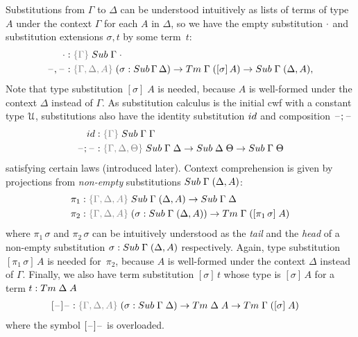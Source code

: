 \documentclass[a4paper,UKenglish,numberwithinsect,cleveref,thm-restate]{lipics-v2021}
\begin{document}
Substitutions from $\Gamma$ to $\Delta$ can be understood intuitively as lists of terms of type $A$ under the context $\Gamma$ for each $A$ in $\Delta$, so we have the empty substitution $\cdot$ and substitution extensions $\sigma, t$ by some term~$t$:
\begin{alignat*}{3}
  \emptysub & : \implicit{\Gamma}\;\Sub\;\Gamma\;\emptyctx \\
  \blank,\blank & : \implicit{\Gamma, \Delta, A}\;(\sigma : \Sub\,\Gamma\,\Delta) \to \Tm\;\Gamma\;([ \sigma ]\, A) \to \Sub\;\Gamma\;(\Delta, A),
\end{alignat*}
Note that type substitution $[\sigma]\;A$ is needed, because $A$ is well-formed under the context $\Delta$ instead of $\Gamma$.
As substitution calculus is the initial cwf with a constant type $\mathcal{U}$, substitutions also have the identity substitution $\idS$ and composition $\mathord{\hspace{1pt}\text{--}\hspace{1pt}};\mathord{\hspace{1pt}\text{--}\hspace{1pt}}$
\begin{alignat*}{3}
  \idS & : \implicit{\Gamma}\;\Sub\;\Gamma\;\Gamma \\
  \blank;\blank & : \implicit{\Gamma, \Delta, \Theta}\;\Sub\;\Gamma\;\Delta \to \Sub\;\Delta\;\Theta \to \Sub\;\Gamma\;\Theta \\
\end{alignat*}
satisfying certain laws (introduced later).
Context comprehension is given by projections from \emph{non-empty} substitutions $\Sub\;\Gamma\;(\Delta, A)$:
\begin{alignat*}{3}
  \pi_1 & : \implicit{\Gamma, \Delta, A}\;\Sub\;\Gamma\;(\Delta, A) \to \Sub\;\Gamma\;\Delta \\
  \pi_2 & : \implicit{\Gamma, \Delta, A}\;(\sigma : \Sub\;\Gamma\;(\Delta, A)) \to \Tm\;\Gamma\;([ \pi_1\,\sigma ]\; A)
\end{alignat*}
where $\pi_1\,\sigma$ and $\pi_2\,\sigma$ can be intuitively understood as the \emph{tail} and the \emph{head} of a non-empty substitution $\sigma : \Sub\;\Gamma\;(\Delta, A)$ respectively.
Again, type substitution $[\pi_1\,\sigma]\,A$ is needed for~$\pi_2$, because $A$ is well-formed under the context $\Delta$ instead of $\Gamma$.
Finally, we also have term substitution $[\sigma]\,t$ whose type is $[\sigma]\,A$ for a term $t : \Tm\;\Delta\;A$
\begin{alignat*}{3}
  [\blank] \blank & : \implicit{\Gamma,\Delta, A}\;(\sigma : \Sub\;\Gamma\;\Delta) \to \Tm\;\Delta\;A \to \Tm\;\Gamma\;([\sigma]\; A)
\end{alignat*}
where the symbol $[\mathord{\hspace{1pt}\text{--}\hspace{1pt}}]\mathord{\hspace{1pt}\text{--}\hspace{1pt}}$ is overloaded.
\end{document}
